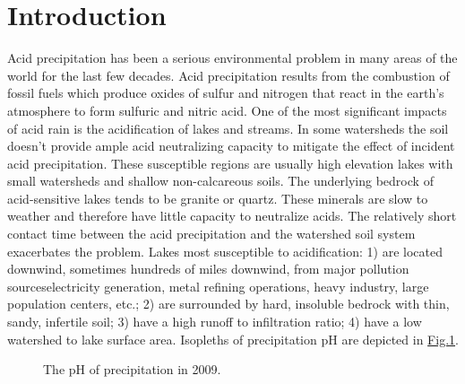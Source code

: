 \documentclass[letterpaper,10pt,english]{sphinxmanual}
\let\sphinxpxdimen\pdfpxdimen\else\newdimen\sphinxpxdimen
\begin{document}
\section{Introduction}
\label{\detokenize{Acid_Rain/Acid_Rain:introduction}}\label{\detokenize{Acid_Rain/Acid_Rain:heading-acid-rain-introduction}}
Acid precipitation has been a serious environmental problem in many areas of the world for the last few decades. Acid precipitation results from the combustion of fossil fuels which produce oxides of sulfur and nitrogen that react in the earth’s atmosphere to form sulfuric and nitric acid. One of the most significant impacts of acid rain is the acidification of lakes and streams. In some watersheds the soil doesn’t provide ample acid neutralizing capacity to mitigate the effect of incident acid precipitation. These susceptible regions are usually high elevation lakes with small watersheds and shallow non-calcareous soils. The underlying bedrock of acid-sensitive lakes tends to be granite or quartz. These minerals are slow to weather and therefore have little capacity to neutralize acids. The relatively short contact time between the acid precipitation and the watershed soil system exacerbates the problem. Lakes most susceptible to acidification: 1) are located downwind, sometimes hundreds of miles downwind, from major pollution sources\textendash{}electricity generation, metal refining operations, heavy industry, large population centers, etc.; 2) are surrounded by hard, insoluble bedrock with thin, sandy, infertile soil; 3) have a high runoff to infiltration ratio; 4) have a low watershed to lake surface area. Isopleths of precipitation pH are depicted in \hyperref[\detokenize{Acid_Rain/Acid_Rain:figure-acid-rain-us}]{Fig.\@ \ref{\detokenize{Acid_Rain/Acid_Rain:figure-acid-rain-us}}}.

\begin{figure}[htbp]
\centering
\capstart

\noindent\sphinxincludegraphics[width=300\sphinxpxdimen]{{Acid_rain_US}.png}
\caption{The pH of precipitation in 2009.}\label{\detokenize{Acid_Rain/Acid_Rain:id1}}\label{\detokenize{Acid_Rain/Acid_Rain:figure-acid-rain-us}}\end{figure}
\end{document}
